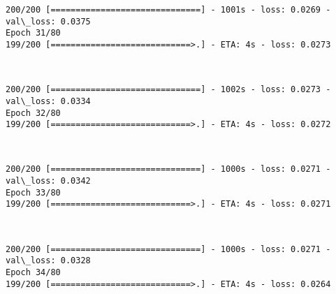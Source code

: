 \documentclass[11pt]{article}
\begin{document}
    \begin{Verbatim}[commandchars=\\\{\}]
200/200 [==============================] - 1001s - loss: 0.0269 - val\_loss: 0.0375
Epoch 31/80
199/200 [============================>.] - ETA: 4s - loss: 0.0273
    \end{Verbatim}

    \begin{center}
    \end{center}
    { \hspace*{\fill} \\}
    
    \begin{Verbatim}[commandchars=\\\{\}]
200/200 [==============================] - 1002s - loss: 0.0273 - val\_loss: 0.0334
Epoch 32/80
199/200 [============================>.] - ETA: 4s - loss: 0.0272
    \end{Verbatim}

    \begin{center}
    \end{center}
    { \hspace*{\fill} \\}
    
    \begin{Verbatim}[commandchars=\\\{\}]
200/200 [==============================] - 1000s - loss: 0.0271 - val\_loss: 0.0342
Epoch 33/80
199/200 [============================>.] - ETA: 4s - loss: 0.0271
    \end{Verbatim}

    \begin{center}
    \end{center}
    { \hspace*{\fill} \\}
    
    \begin{Verbatim}[commandchars=\\\{\}]
200/200 [==============================] - 1000s - loss: 0.0271 - val\_loss: 0.0328
Epoch 34/80
199/200 [============================>.] - ETA: 4s - loss: 0.0264
    \end{Verbatim}

    \begin{center}
    \end{center}
    { \hspace*{\fill} \\}
    
\end{document}
